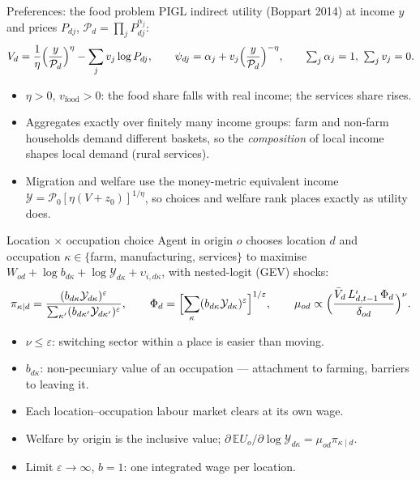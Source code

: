 \documentclass[10pt,aspectratio=169]{beamer}
\begin{document}
\begin{frame}{Preferences: the food problem}
  PIGL indirect utility (Boppart 2014) at income $y$ and prices $P_{dj}$,
  $\mathcal P_d=\prod_jP_{dj}^{\alpha_j}$:
  \begin{equation*}
    V_d=\frac1\eta\Bigl(\frac{y}{\mathcal P_d}\Bigr)^{\eta}-\sum_j v_j\log P_{dj},
    \qquad
    \psi_{dj}=\alpha_j+v_j\Bigl(\frac{y}{\mathcal P_d}\Bigr)^{-\eta},
    \qquad \textstyle\sum_j\alpha_j=1,\ \sum_jv_j=0.
  \end{equation*}
  \small
  \begin{itemize}
    \item $\eta>0$, $v_{\text{food}}>0$: the food share falls with real income; the
          services share rises.
    \item Aggregates exactly over finitely many income groups: farm and non-farm
          households demand different baskets, so the \emph{composition} of local income
          shapes local demand (rural services).
    \item Migration and welfare use the money-metric equivalent income
          $\mathcal Y=\mathcal P_0[\eta(V+z_0)]^{1/\eta}$, so choices and welfare rank
          places exactly as utility does.
  \end{itemize}
\end{frame}

\begin{frame}{Location $\times$ occupation choice}
  Agent in origin $o$ chooses location $d$ and occupation $\kappa\in\{$farm, manufacturing,
  services$\}$ to maximise
  $W_{od}+\log b_{d\kappa}+\log\mathcal Y_{d\kappa}+\upsilon_{i,d\kappa}$, with nested-logit
  (GEV) shocks:
  \begin{equation*}
    \pi_{\kappa\mid d}=\frac{(b_{d\kappa}\mathcal Y_{d\kappa})^{\varepsilon}}
                            {\sum_{\kappa'}(b_{d\kappa'}\mathcal Y_{d\kappa'})^{\varepsilon}},
    \qquad
    \Phi_d=\Bigl[\sum_\kappa(b_{d\kappa}\mathcal Y_{d\kappa})^{\varepsilon}\Bigr]^{1/\varepsilon},
    \qquad
    \mu_{od}\propto\Bigl(\frac{\bar V_d\,L_{d,t-1}^{\iota}\,\Phi_d}{\delta_{od}}\Bigr)^{\nu}.
  \end{equation*}
  \small
  \begin{itemize}
    \item $\nu\le\varepsilon$: switching sector within a place is easier than moving.
    \item $b_{d\kappa}$: non-pecuniary value of an occupation --- attachment to farming,
          barriers to leaving it.
    \item Each location--occupation labour market clears at its own wage.
    \item Welfare by origin is the inclusive value;
          $\partial\,\mathbb E U_o/\partial\log\mathcal Y_{d\kappa}=\mu_{od}\pi_{\kappa\mid d}$.
    \item Limit $\varepsilon\to\infty$, $b=1$: one integrated wage per location.
  \end{itemize}
\end{frame}
\end{document}
